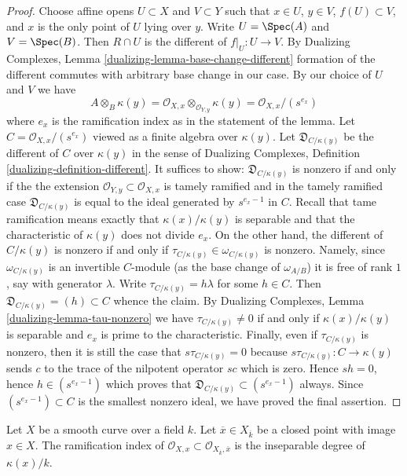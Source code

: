 \begin{proof}
\medskip\noindent
Choose affine opens $U \subset X$ and $V \subset Y$
such that $x \in U$, $y \in V$, $f(U) \subset V$, and $x$ is the only
point of $U$ lying over $y$. Write $U = \Spec(A)$ and $V = \Spec(B)$.
Then $R \cap U$ is the different of $f|_U : U \to V$.
By Dualizing Complexes, Lemma \ref{dualizing-lemma-base-change-different}
formation of the different commutes with arbitrary base change
in our case. By our choice of $U$ and $V$ we have
$$
A \otimes_B \kappa(y) =
\mathcal{O}_{X, x} \otimes_{\mathcal{O}_{Y, y}} \kappa(y) =
\mathcal{O}_{X, x}/(s^{e_x})
$$
where $e_x$ is the ramification index as in the statement of the lemma.
Let $C = \mathcal{O}_{X, x}/(s^{e_x})$ viewed as a finite algebra
over $\kappa(y)$. Let $\mathfrak{D}_{C/\kappa(y)}$ be the different
of $C$ over $\kappa(y)$ in the sense of
Dualizing Complexes, Definition \ref{dualizing-definition-different}.
It suffices to show: $\mathfrak{D}_{C/\kappa(y)}$
is nonzero if and only if the the extension
$\mathcal{O}_{Y, y} \subset \mathcal{O}_{X, x}$ is tamely ramified
and in the tamely ramified case $\mathfrak{D}_{C/\kappa(y)}$
is equal to the ideal generated by $s^{e_x - 1}$ in $C$.
Recall that tame ramification means exactly that $\kappa(x)/\kappa(y)$
is separable and that the characteristic of $\kappa(y)$ does not
divide $e_x$. On the other hand, the different of $C/\kappa(y)$ is nonzero
if and only if $\tau_{C/\kappa(y)} \in \omega_{C/\kappa(y)}$ is nonzero.
Namely, since $\omega_{C/\kappa(y)}$ is an invertible $C$-module
(as the base change of $\omega_{A/B}$)
it is free of rank $1$, say with generator $\lambda$. Write
$\tau_{C/\kappa(y)} = h\lambda$ for some $h \in C$. Then
$\mathfrak{D}_{C/\kappa(y)} = (h) \subset C$ whence the claim.
By Dualizing Complexes, Lemma \ref{dualizing-lemma-tau-nonzero}
we have $\tau_{C/\kappa(y)} \not = 0$
if and only if $\kappa(x)/\kappa(y)$
is separable and $e_x$ is prime to the characteristic.
Finally, even if $\tau_{C/\kappa(y)}$ is nonzero, then
it is still the case that $s \tau_{C/\kappa(y)} = 0$
because $s\tau_{C/\kappa(y)} : C \to \kappa(y)$
sends $c$ to the trace of the nilpotent operator $sc$ which is zero.
Hence $sh = 0$, hence $h \in (s^{e_x - 1})$ which proves
that $\mathfrak{D}_{C/\kappa(y)} \subset (s^{e_x - 1})$ always.
Since $(s^{e_x - 1}) \subset C$ is the smallest nonzero ideal,
we have proved the final assertion.
\end{proof}

\begin{lemma}
\label{lemma-ramification-to-algebraic-closure}
Let $X$ be a smooth curve over a field $k$. Let
$\overline{x} \in X_{\overline{k}}$ be a closed
point with image $x \in X$. The ramification index of
$\mathcal{O}_{X, x} \subset \mathcal{O}_{X_{\overline{k}}, \overline{x}}$
is the inseparable degree of $\kappa(x)/k$.
\end{lemma}

